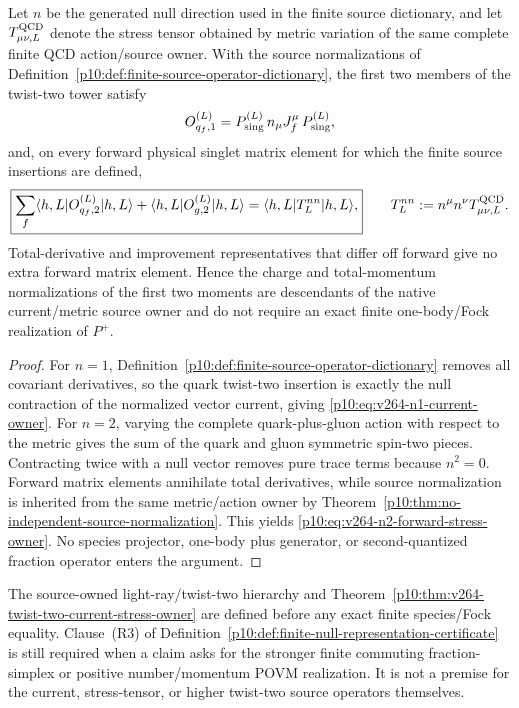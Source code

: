 \documentclass[12pt,a4paper]{article}
\begin{document}
\begin{theorem}
\label{p10:thm:v264-twist-two-current-stress-owner}
Let \(n\) be the generated null direction used in the finite source dictionary, and let
\(T_{\mu\nu,L}^{\rm QCD}\) denote the stress tensor obtained by metric variation of the same complete finite QCD action/source owner.  With the source normalizations of Definition~\ref{p10:def:finite-source-operator-dictionary}, the first two members of the twist-two tower satisfy
\begin{equation}
\label{p10:eq:v264-n1-current-owner}
 O_{q_f,1}^{(L)}
 =P_{\rm sing}^{(L)}\,n_\mu J_f^\mu\,P_{\rm sing}^{(L)},
\end{equation}
and, on every forward physical singlet matrix element for which the finite source insertions are defined,
\begin{equation}
\label{p10:eq:v264-n2-forward-stress-owner}
 \boxed{
 \sum_f\langle h,L|O_{q_f,2}^{(L)}|h,L\rangle
 +\langle h,L|O_{g,2}^{(L)}|h,L\rangle
 =\langle h,L|T_{L}^{nn}|h,L\rangle,}
 \qquad
 T_L^{nn}:=n^\mu n^\nu T_{\mu\nu,L}^{\rm QCD}.
\end{equation}
Total-derivative and improvement representatives that differ off forward give no extra forward matrix element.  Hence the charge and total-momentum normalizations of the first two moments are descendants of the native current/metric source owner and do not require an exact finite one-body/Fock realization of \(P^+\).
\end{theorem}
\begin{proof}
For \(n=1\), Definition~\ref{p10:def:finite-source-operator-dictionary} removes all covariant derivatives, so the quark twist-two insertion is exactly the null contraction of the normalized vector current, giving \eqref{p10:eq:v264-n1-current-owner}.  For \(n=2\), varying the complete quark-plus-gluon action with respect to the metric gives the sum of the quark and gluon symmetric spin-two pieces.  Contracting twice with a null vector removes pure trace terms because \(n^2=0\).  Forward matrix elements annihilate total derivatives, while source normalization is inherited from the same metric/action owner by Theorem~\ref{p10:thm:no-independent-source-normalization}.  This yields \eqref{p10:eq:v264-n2-forward-stress-owner}.  No species projector, one-body plus generator, or second-quantized fraction operator enters the argument.
\end{proof}

\begin{remark}
\label{p10:rem:v264-lfrep-stronger-than-twist-two-owner}
The source-owned light-ray/twist-two hierarchy and Theorem~\ref{p10:thm:v264-twist-two-current-stress-owner} are defined before any exact finite species/Fock equality.  Clause~\textnormal{(R3)} of Definition~\ref{p10:def:finite-null-representation-certificate} is still required when a claim asks for the stronger finite commuting fraction-simplex or positive number/momentum POVM realization.  It is not a premise for the current, stress-tensor, or higher twist-two source operators themselves.
\end{remark}
\end{document}
